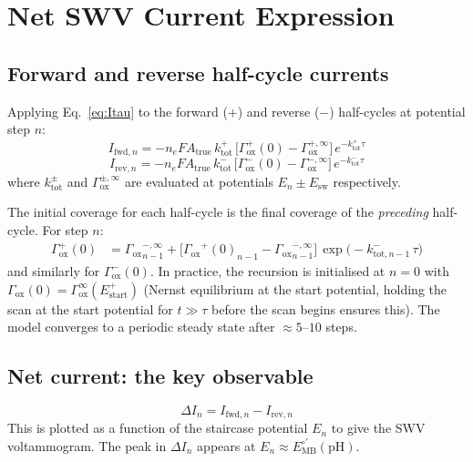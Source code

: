 \documentclass[10pt,a4paper]{article}
\numberwithin{equation}{section}
\newcommand{\Eo}{E^{\circ\prime}}
\newcommand{\Gox}{\Gamma_{\text{ox}}}
\newcommand{\DI}{\Delta I}
\newcommand{\Esw}{E_{\text{sw}}}
\begin{document}
\section{Net SWV Current Expression}
\label{sec:netcurrent}

\subsection{Forward and reverse half-cycle currents}

Applying Eq.~\eqref{eq:Itau} to the forward ($+$) and reverse ($-$)
half-cycles at potential step $n$:
\begin{equation}
  I_{\text{fwd},n} = -n_e F A_{\text{true}}\,k_{\text{tot}}^+\,
  \bigl[\Gox^+(0) - \Gox^{+,\infty}\bigr]\,e^{-k_{\text{tot}}^+ \tau}
  \label{eq:Ifwd}
\end{equation}
\begin{equation}
  I_{\text{rev},n} = -n_e F A_{\text{true}}\,k_{\text{tot}}^-\,
  \bigl[\Gox^-(0) - \Gox^{-,\infty}\bigr]\,e^{-k_{\text{tot}}^- \tau}
  \label{eq:Irev}
\end{equation}
where $k_{\text{tot}}^\pm$ and $\Gox^{\pm,\infty}$ are evaluated at
potentials $E_n \pm \Esw$ respectively.

The initial coverage for each half-cycle is the final coverage of
the \textit{preceding} half-cycle. For step $n$:
\begin{align}
  \Gox^+(0) &= {\Gox}^{-,\infty}_{n-1} + \bigl[{\Gox}^+(0)_{n-1} -
    {\Gox}^{-,\infty}_{n-1}\bigr]\,\exp\!\bigl(-{k_{\text{tot},n-1}^{-}}\,\tau\bigr)
  \label{eq:Goxp0}
\end{align}
and similarly for $\Gox^-(0)$. In practice, the recursion is
initialised at $n = 0$ with $\Gox(0) = \Gox^\infty(E_{\text{start}}^+)$
(Nernst equilibrium at the start potential, holding the scan at the
start potential for $t \gg \tau$ before the scan begins ensures
this). The model converges to a periodic steady state after
$\approx 5$--$10$ steps.

\subsection{Net current: the key observable}

\begin{equation}
  \boxed{\DI_n = I_{\text{fwd},n} - I_{\text{rev},n}}
  \label{eq:DInfull}
\end{equation}
This is plotted as a function of the staircase potential $E_n$ to
give the SWV voltammogram. The peak in $\DI_n$ appears at
$E_n \approx \Eo_{\text{MB}}(\text{pH})$.
\end{document}
